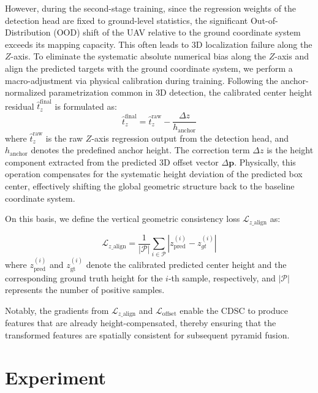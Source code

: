 \documentclass[conference]{IEEEtran}
\begin{document}
However, during the second-stage training, since the regression weights of the detection head are fixed to ground-level statistics, the significant Out-of-Distribution (OOD) shift of the UAV relative to the ground coordinate system exceeds its mapping capacity. This often leads to 3D localization failure along the $Z$-axis. To eliminate the systematic absolute numerical bias along the $Z$-axis and align the predicted targets with the ground coordinate system, we perform a macro-adjustment via physical calibration during training. Following the anchor-normalized parametrization common in 3D detection, the calibrated center height residual $\hat{t}_{z}^{\text{final}}$ is formulated as:
\begin{equation}
\hat{t}_{z}^{\text{final}} = \hat{t}_{z}^{\text{raw}} - \frac{\Delta z}{h_{\text{anchor}}}
\end{equation}
where $\hat{t}_{z}^{\text{raw}}$ is the raw $Z$-axis regression output from the detection head, and $h_{\text{anchor}}$ denotes the predefined anchor height. The correction term $\Delta z$ is the height component extracted from the predicted 3D offset vector $\Delta \mathbf{p}$. Physically, this operation compensates for the systematic height deviation of the predicted box center, effectively shifting the global geometric structure back to the baseline coordinate system.

On this basis, we define the vertical geometric consistency loss $\mathcal{L}_{z\_\text{align}}$ as:

\begin{equation}
\mathcal{L}_{z\_\text{align}} = \frac{1}{|\mathcal{P}|} \sum_{i \in \mathcal{P}} |z_{\text{pred}}^{(i)} - z_{gt}^{(i)}|
\end{equation}
where $z_{\text{pred}}^{(i)}$ and $z_{\text{gt}}^{(i)}$ denote the calibrated predicted center height and the corresponding ground truth height for the $i$-th sample, respectively, and $|\mathcal{P}|$ represents the number of positive samples.

Notably, the gradients from $\mathcal{L}_{z\_\text{align}}$ and $\mathcal{L}_{\text{offset}}$ enable the CDSC to produce features that are already height-compensated, thereby ensuring that the transformed features are spatially consistent for subsequent pyramid fusion.



\section{Experiment}
\end{document}
